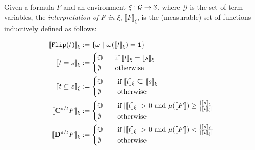\begin{defn}\label{def:quantsemlmq}
Given a formula
$F$ and an environment $\xi:\mathcal{G}\rightarrow
\mathbb{S}$, where $\mathcal{G}$
is the set of term variables,
the \emph{interpretation of F in $\xi$},
$\llbracket F\rrbracket_\xi$,
is the (measurable) set of functions
inductively defined as follows:

\begin{minipage}{\linewidth}
\begin{minipage}[t]{0.4\linewidth}
\begin{align*}
\llbracket \Flip(t)\rrbracket_{\xi} &:= \{\omega \ | \
\omega(\llbracket t\rrbracket_{\xi}) = \oone\} \\
\llbracket t=s\rrbracket_\xi &:= \begin{cases}
\Os \ \ &\text{if } \llbracket t\rrbracket_\xi = \llbracket s\rrbracket_\xi \\
\emptyset \ \ &\text{otherwise}
\end{cases} \\
\llbracket t\subseteq s\rrbracket_{\xi} &:=
\begin{cases}
\Os \ \ \ &\text{if } \llbracket t\rrbracket_\xi
\ssubseteq \llbracket s\rrbracket_\xi \\
\emptyset \ \ \ &\text{otherwise}
\end{cases}\\
\llbracket \cq {s/t} F\rrbracket_{\xi} &:=
\begin{cases}
\Os \ \ \ &\text{if }|\llbracket t\rrbracket_\xi|>0 \text{ and } \mu (\llbracket F\rrbracket)\ge\frac{|\llbracket s\rrbracket_\xi|}
{|\llbracket t\rrbracket_\xi|} \\
\emptyset \ \ \ &\text{otherwise}
\end{cases}\\
\llbracket \dq {s/t} F\rrbracket_{\xi} &:=
\begin{cases}
\Os \ \ \ &\text{if }|\llbracket t\rrbracket_\xi|>0 \text{ and } \mu (\llbracket F\rrbracket)<\frac{|\llbracket s\rrbracket_\xi|}
{|\llbracket t\rrbracket_\xi|} \\
\emptyset \ \ \ &\text{otherwise}
\end{cases}
\end{align*}
\end{minipage}
\hfill
\begin{minipage}[t]{0.5\linewidth}
\begin{align*}

\end{align*}
\end{minipage}
\end{minipage}
\end{defn}
